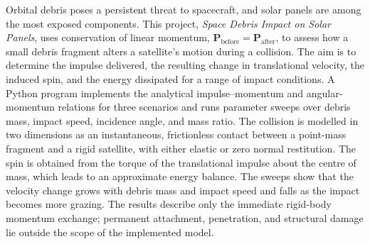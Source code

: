 Orbital debris poses a persistent threat to spacecraft, and solar panels are
among the most exposed components. This project, \textit{Space Debris Impact on
Solar Panels}, uses conservation of linear momentum,
$\mathbf{P}_{\mathrm{before}} = \mathbf{P}_{\mathrm{after}}$, to assess how a
small debris fragment alters a satellite's motion during a collision. The aim is
to determine the impulse delivered, the resulting change in translational
velocity, the induced spin, and the energy dissipated for a range of impact
conditions. A Python program implements the analytical impulse--momentum and
angular-momentum relations for three scenarios and runs parameter sweeps over
debris mass, impact speed, incidence angle, and mass ratio. The collision is
modelled in two dimensions as an instantaneous, frictionless contact between a
point-mass fragment and a rigid satellite, with either elastic or zero normal
restitution. The spin is obtained from the torque of the translational impulse
about the centre of mass, which leads to an approximate energy balance. The
sweeps show that the velocity change grows with debris mass and impact speed and
falls as the impact becomes more grazing. The results describe only the
immediate rigid-body momentum exchange; permanent attachment, penetration, and
structural damage lie outside the scope of the implemented model.